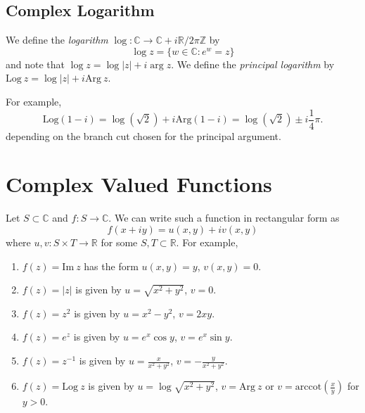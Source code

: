 \subsection{Complex Logarithm}
We define the \emph{logarithm}
$\log : \mathbb{C} \to \mathbb{C} + i \mathbb{R} / 2 \pi \mathbb{Z}$
by
$$
\log z = \{ w \in \mathbb{C} : e^w = z \}
$$
and note that $\log z = \log |z| + i \arg z$. We define the
\emph{principal logarithm}
by $\mathrm{Log}~z = \log |z| + i \mathrm{Arg}~z$.

For example,
$$
  \mathrm{Log}(1 - i)
= \log(\sqrt{2}) + i \mathrm{Arg}(1 - i)
= \log(\sqrt{2}) \pm i \frac{1}{4} \pi.
$$
depending on the branch cut chosen for the principal argument.

\section{Complex Valued Functions}
Let $S \subset \mathbb{C}$ and $f : S \to \mathbb{C}$. We can write
such a function in rectangular form as
$$
f(x + iy) = u(x, y) + i v(x, y)
$$
where $u, v : S \times T \to \mathbb{R}$ for some
$S, T \subset \mathbb{R}$. For example,
\begin{enumerate}
  \item{
    $f(z) = \mathrm{Im}~z$ has the form $u(x,y) = y$, $v(x,y) = 0$.
  }
  \item{
    $f(z) = |z|$ is given by $u = \sqrt{x^2 + y^2}$, $v = 0$.
  }
  \item{
    $f(z) = z^2$ is given by $u = x^2 - y^2$, $v = 2xy$.
  }
  \item{
    $f(z) = e^z$ is given by $u = e^x \cos y$, $v = e^x \sin y$.
  }
  \item{
    $f(z) = z^{-1}$ is given by $u = \frac{x}{x^2 + y^2}$, $v = -\frac{y}{x^2 + y^2}$.
  }
  \item{
    $f(z) = \mathrm{Log}~z$ is given by $u = \log \sqrt{x^2 + y^2}$,
    $v = \mathrm{Arg}~z$ or
    $v = \mathrm{arccot}\left(\frac{x}{y}\right)$ for $y > 0$.
  }
\end{enumerate}
